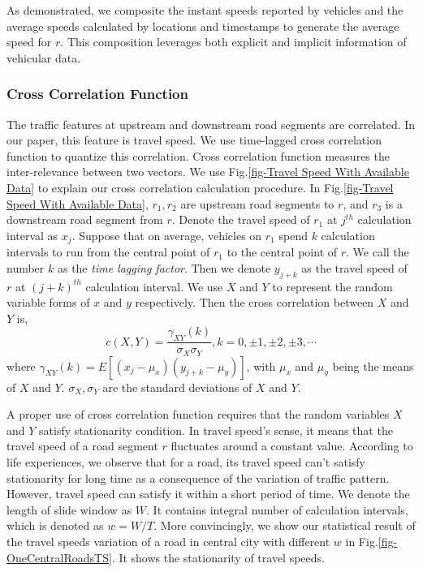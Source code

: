 \documentclass[twocolumn,10pt,final,conference]{IEEEtran}
\begin{document}
As demonstrated, we composite the instant speeds reported by vehicles and the average speeds calculated by locations and timestamps to generate the average speed for $r$. This composition leverages both explicit and implicit information of vehicular data.


\subsubsection{Cross Correlation Function}\label{section-sub-CCF}
\quad

The traffic features at upstream and downstream road segments are correlated. In our paper, this feature is travel speed. We use time-lagged cross correlation function to quantize this correlation.
Cross correlation function measures the inter-relevance between two vectors. We use Fig.\ref{fig-Travel Speed With Available Data} to explain our cross correlation calculation procedure.
In Fig.\ref{fig-Travel Speed With Available Data}, $r_1, r_2$ are upstream road segments to $r$, and $r_3$ is a downstream road segment from $r$.  Denote the travel speed of $r_1$ at $j^{th}$ calculation interval as $x_{j}$. Suppose that on average, vehicles on $r_1$ spend $k$ calculation intervals to run from the central point of $r_1$ to the central point of $r$. We call the number $k$ as the \emph{time lagging factor}. Then we denote $y_{j+k}$ as the travel speed of $r$ at $(j+k)^{th}$ calculation interval.
We use $X$ and $Y$ to represent the random variable forms of $x$ and $y$ respectively.
Then the cross correlation between $X$ and $Y$ is,
\begin{equation}\label{equ-CCF}
  c(X,Y)=\frac{{\gamma}_{XY}(k)}{\sigma_{X}\sigma_{Y}}, k=0,\pm1,\pm2,\pm3,\cdots
\end{equation}
where
$\gamma_{XY}(k)=E[(x_j-\mu_x)(y_{j+k}-\mu_y)]$,
with $\mu_x$ and $\mu_y$ being the means of $X$ and $Y$.
$\sigma_{X}, \sigma_{Y}$ are the  standard deviations of $X$ and $Y$.

A proper use of cross correlation function requires that the random variables $X$ and $Y$ satisfy stationarity condition. In travel speed's sense, it means that the travel speed of a road segment $r$ fluctuates around a constant value.
According to life experiences, we observe that for a road, its travel speed can't satisfy stationarity for long time as a consequence of the variation of traffic pattern. However, travel speed can satisfy it within a short period of time. We denote the length of slide window as $W$. It contains integral number of calculation intervals, which is denoted as $w=W/T$. More convincingly, we show our statistical result of the  travel speeds variation of a road in central city with different $w$ in Fig.\ref{fig-OneCentralRoadsTS}. It shows the stationarity of travel speeds.
\end{document}
